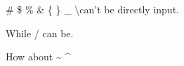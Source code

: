 \documentclass{article}
\begin{document}
	
	\# \quad \$ \quad \% \quad \& \quad \{ \quad \} \quad \_ \quad \textbackslash \quad can't be directly input.
	
	While / can be.
	
	How about \~{} \quad \^{} \quad 	
	
\end{document}
